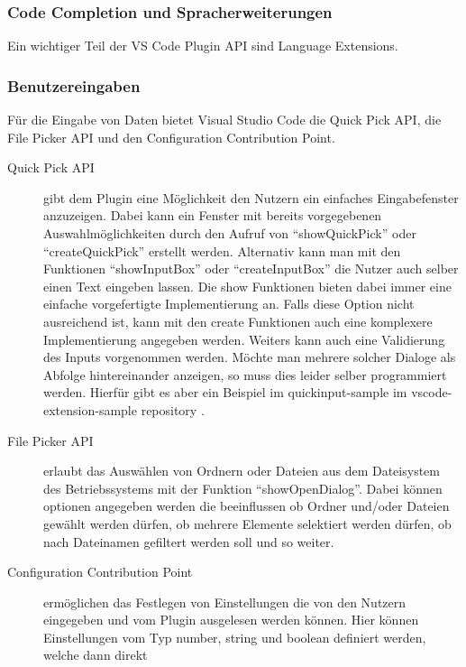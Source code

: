 \subsubsection{Code Completion und Spracherweiterungen}
  Ein wichtiger Teil der VS Code Plugin API sind Language Extensions.

\subsubsection{Benutzereingaben}
  Für die Eingabe von Daten bietet Visual Studio Code die Quick Pick API, die File Picker API
  und den Configuration Contribution Point.
  \begin{description}
    \item[Quick Pick API] gibt dem Plugin eine Möglichkeit den Nutzern ein einfaches Eingabefenster
      anzuzeigen. Dabei kann ein Fenster mit bereits vorgegebenen Auswahlmöglichkeiten durch
      den Aufruf von \enquote{showQuickPick} oder \enquote{createQuickPick} erstellt werden.
      Alternativ kann man mit den Funktionen \enquote{showInputBox} oder \enquote{createInputBox}
      die Nutzer auch selber einen Text eingeben lassen. Die show Funktionen bieten dabei immer
      eine einfache vorgefertigte Implementierung an. Falls diese Option nicht ausreichend ist,
      kann mit den create Funktionen auch eine komplexere Implementierung angegeben werden.
      Weiters kann auch eine Validierung des Inputs vorgenommen werden.
      Möchte man mehrere solcher Dialoge als Abfolge hintereinander anzeigen, so muss dies leider
      selber programmiert werden. Hierfür gibt es aber ein Beispiel im quickinput-sample
      im vscode-extension-sample repository \cite{VSCodeExtensionSamples}. 
    \item[File Picker API] erlaubt das Auswählen von Ordnern oder Dateien aus dem Dateisystem
      des Betriebssystems mit der Funktion \enquote{showOpenDialog}. Dabei können optionen angegeben
      werden die beeinflussen ob Ordner und/oder Dateien gewählt werden dürfen, ob mehrere Elemente
      selektiert werden dürfen, ob nach Dateinamen gefiltert werden soll und so weiter.
    \item[Configuration Contribution Point] ermöglichen das Festlegen von Einstellungen
      die von den Nutzern eingegeben und vom Plugin ausgelesen werden können. Hier können
      Einstellungen vom Typ number, string und boolean definiert werden, welche dann direkt

\end{description}
